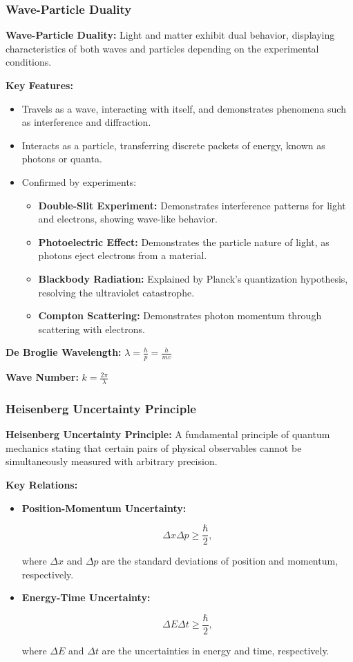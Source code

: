 \documentclass{article}
\newcommand{\eqbox}[1]{\begin{tcolorbox}[colback=gray!10] #1 \end{tcolorbox}}
\newcommand{\conceptbox}[1]{\begin{tcolorbox}[colback=blue!10] #1 \end{tcolorbox}}
\begin{document}
\subsubsection{Wave-Particle Duality}

\conceptbox{
\textbf{Wave-Particle Duality:}
Light and matter exhibit dual behavior, displaying characteristics of both waves and particles depending on the experimental conditions.
}
\conceptbox{
\textbf{Key Features:}
\begin{itemize}
    \item Travels as a wave, interacting with itself, and demonstrates phenomena such as interference and diffraction.
    \item Interacts as a particle, transferring discrete packets of energy, known as photons or quanta.
    \item Confirmed by experiments:
    \begin{itemize}
        \item \textbf{Double-Slit Experiment:} Demonstrates interference patterns for light and electrons, showing wave-like behavior.
        \item \textbf{Photoelectric Effect:} Demonstrates the particle nature of light, as photons eject electrons from a material.
        \item \textbf{Blackbody Radiation:} Explained by Planck's quantization hypothesis, resolving the ultraviolet catastrophe.
        \item \textbf{Compton Scattering:} Demonstrates photon momentum through scattering with electrons.
    \end{itemize}
\end{itemize}
\eqbox{
\textbf{De Broglie Wavelength:} \( \lambda = \displaystyle\frac{h}{p} = \displaystyle\frac{h}{mv} \)
}

\eqbox{
\textbf{Wave Number:} \( k = \displaystyle\frac{2\pi}{\lambda} \)
}
}

\subsubsection{Heisenberg Uncertainty Principle}

\conceptbox{
\textbf{Heisenberg Uncertainty Principle:}
A fundamental principle of quantum mechanics stating that certain pairs of physical observables cannot be simultaneously measured with arbitrary precision.
}

\conceptbox{
\textbf{Key Relations:}
\begin{itemize}
    \item \textbf{Position-Momentum Uncertainty:}
    \eqbox{
    \[
    \Delta x \Delta p \geq \frac{\hbar}{2},
    \]
    }
    where \( \Delta x \) and \( \Delta p \) are the standard deviations of position and momentum, respectively.
    \item \textbf{Energy-Time Uncertainty:}
    \eqbox{
    \[
    \Delta E \Delta t \geq \frac{\hbar}{2},
    \]
    }
    where \( \Delta E \) and \( \Delta t \) are the uncertainties in energy and time, respectively.
\end{itemize}
}
\end{document}
